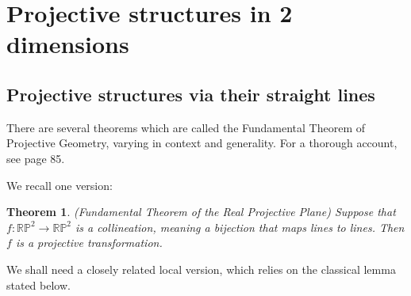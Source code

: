 \documentclass[12pt]{article}
\numberwithin{equation}{section}
\newcounter{count}
\theoremstyle{plain}
\newtheorem{theorem}[definition]{Theorem}
\theoremstyle{definition}
\newcommand{\RP}{\mathbb{RP}}
\newcommand{\ra}{\rightarrow}
\begin{document}





\section{Projective structures in 2 dimensions}\label{proj2d}

\subsection{Projective structures via their straight lines}

There are several theorems which are called the Fundamental Theorem of Projective Geometry, varying in context and generality. For a thorough account, see \cite{artinga} page 85.

We recall one version:
\begin{theorem} \emph{(Fundamental Theorem of the Real Projective Plane)} Suppose that $f:\RP^{2}\ra\RP^{2}$ is a collineation, meaning a bijection that maps lines to lines. Then $f$ is a projective transformation.
\end{theorem}
We shall need a closely related local version, which relies on the classical lemma stated below.
\end{document}
